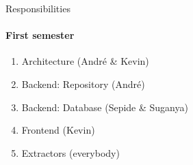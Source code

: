 \begin{frame}{Responsibilities}
\framesubtitle{First semester}
	\begin{enumerate}
		\item Architecture (André \& Kevin)
		\item Backend: Repository (André)
		\item Backend: Database (Sepide \& Suganya)
		\item Frontend (Kevin)
		\item Extractors (everybody)
	\end{enumerate}
\end{frame}